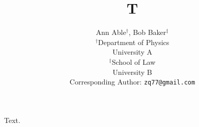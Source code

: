 \documentclass{article}
\title{T}
\author{Ann Able$^{\dagger}$, Bob Baker$^{\ddagger}$ \\ $^\dagger$Department of Physics \\ University A \\ $^\ddagger$School of Law \\ University B \\ Corresponding Author: \texttt{zq77@gmail.com}}
\begin{document}
\maketitle
Text.
\end{document}
